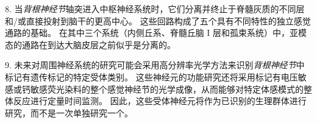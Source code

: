 8. 当\textit{背根神经节}轴突进入中枢神经系统时，它们分离并终止于脊髓灰质的不同层和/或直接投射到脑干的更高中心。
这些回路构成了五个具有不同特性的独立感觉通路的基础。
在其中三个系统（内侧丘系、脊髓丘脑 I 层和孤束系统）中，亚模态的通路在到达大脑皮层之前似乎是分离的。 


9. 未来对周围神经系统的研究可能会采用高分辨率光学方法来识别\textit{背根神经节}中标记有遗传标记的特定受体类别。
这些神经元的功能研究还将采用标记有电压敏感或钙敏感荧光染料的整个感觉神经节的光学成像，从而能够对特定体感模式的整体反应进行定量时间监测。
因此，这些受体神经元将作为已识别的生理群体进行研究，而不是一次单独研究一个。


